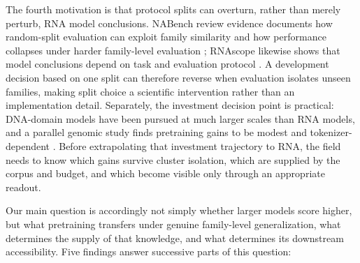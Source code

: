 The fourth motivation is that protocol splits can overturn, rather than merely perturb, RNA model conclusions. NABench review evidence documents how random-split evaluation can exploit family similarity and how performance collapses under harder family-level evaluation \citep{nabench}; RNAscope likewise shows that model conclusions depend on task and evaluation protocol \citep{rnascope}. A development decision based on one split can therefore reverse when evaluation isolates unseen families, making split choice a scientific intervention rather than an implementation detail. Separately, the investment decision point is practical: DNA-domain models have been pursued at much larger scales than RNA models, and a parallel genomic study finds pretraining gains to be modest and tokenizer-dependent \citep{vishniakov_tokenization}. Before extrapolating that investment trajectory to RNA, the field needs to know which gains survive cluster isolation, which are supplied by the corpus and budget, and which become visible only through an appropriate readout.

Our main question is accordingly not simply whether larger models score higher, but what pretraining transfers under genuine family-level generalization, what determines the supply of that knowledge, and what determines its downstream accessibility. Five findings answer successive parts of this question:

